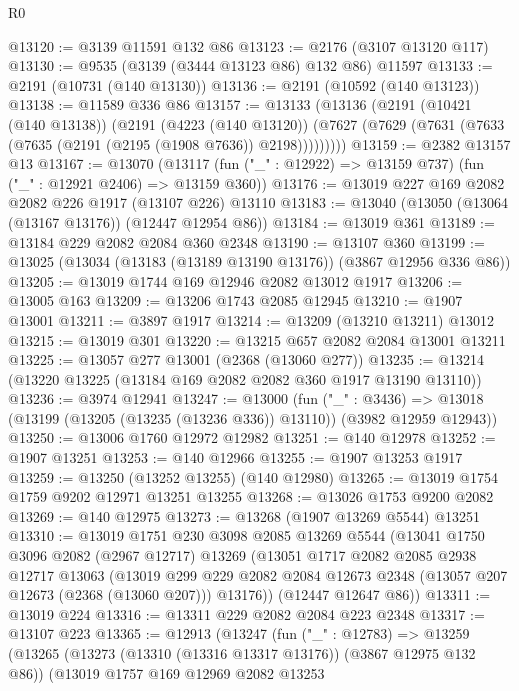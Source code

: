 \begin{lexlean}{R0}
\begin{coremodule}
@13120 := @3139 @11591 @132 @86
@13123 := @2176 (@3107 @13120 @117)
@13130 := @9535 (@3139 (@3444 @13123 @86) @132 @86) @11597
@13133 := @2191 (@10731 (@140 @13130))
@13136 := @2191 (@10592 (@140 @13123))
@13138 := @11589 @336 @86
@13157 := @13133
    (@13136
      (@2191
        (@10421 (@140 @13138))
        (@2191
          (@4223 (@140 @13120))
          (@7627 (@7629 (@7631 (@7633 (@7635 (@2191 (@2195 (@1908 @7636)) @2198)))))))))
@13159 := @2382 @13157 @13
@13167 := @13070
    (@13117 (fun ("_" : @12922) => @13159 @737) (fun ("_" : @12921 @2406) => @13159 @360))
@13176 := @13019 @227 @169 @2082 @2082 @226 @1917 (@13107 @226) @13110
@13183 := @13040 (@13050 (@13064 (@13167 @13176)) (@12447 @12954 @86))
@13184 := @13019 @361
@13189 := @13184 @229 @2082 @2084 @360 @2348
@13190 := @13107 @360
@13199 := @13025 (@13034 (@13183 (@13189 @13190 @13176)) (@3867 @12956 @336 @86))
@13205 := @13019 @1744 @169 @12946 @2082 @13012 @1917
@13206 := @13005 @163
@13209 := @13206 @1743 @2085 @12945
@13210 := @1907 @13001
@13211 := @3897 @1917
@13214 := @13209 (@13210 @13211) @13012
@13215 := @13019 @301
@13220 := @13215 @657 @2082 @2084 @13001 @13211
@13225 := @13057 @277 @13001 (@2368 (@13060 @277))
@13235 := @13214 (@13220 @13225 (@13184 @169 @2082 @2082 @360 @1917 @13190 @13110))
@13236 := @3974 @12941
@13247 := @13000
    (fun ("_" : @3436) =>
    @13018 (@13199 (@13205 (@13235 (@13236 @336)) @13110)) (@3982 @12959 @12943))
@13250 := @13006 @1760 @12972 @12982
@13251 := @140 @12978
@13252 := @1907 @13251
@13253 := @140 @12966
@13255 := @1907 @13253 @1917
@13259 := @13250 (@13252 @13255) (@140 @12980)
@13265 := @13019 @1754 @1759 @9202 @12971 @13251 @13255
@13268 := @13026 @1753 @9200 @2082
@13269 := @140 @12975
@13273 := @13268 (@1907 @13269 @5544) @13251
@13310 := @13019
    @1751
    @230
    @3098
    @2085
    @13269
    @5544
    (@13041
      @1750
      @3096
      @2082
      (@2967 @12717)
      @13269
      (@13051
        @1717
        @2082
        @2085
        @2938
        @12717
        @13063
        (@13019
          @299
          @229
          @2082
          @2084
          @12673
          @2348
          (@13057 @207 @12673 (@2368 (@13060 @207)))
          @13176))
      (@12447 @12647 @86))
@13311 := @13019 @224
@13316 := @13311 @229 @2082 @2084 @223 @2348
@13317 := @13107 @223
@13365 := @12913
    (@13247
      (fun ("_" : @12783) =>
      @13259
        (@13265
          (@13273 (@13310 (@13316 @13317 @13176)) (@3867 @12975 @132 @86))
          (@13019
            @1757
            @169
            @12969
            @2082
            @13253

\end{coremodule}
\end{lexlean}
